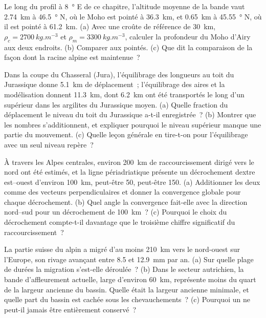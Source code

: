 \begin{exercise}[$\star\star$]\label{exo:b2:alpine-orogen:9}
Le long du profil à \qty{8}{\degree} E de ce chapitre, l'altitude moyenne de la bande vaut
\qty{2.74}{km} à \qty{46.5}{\degree} N, où le Moho est pointé à \qty{36.3}{km}, et
\qty{0.65}{km} à \qty{45.55}{\degree} N, où il est pointé à \qty{61.2}{km}. (a) Avec une
croûte de référence de \qty{30}{km}, $\rho_c = \qty{2700}{kg.m^{-3}}$ et $\rho_m =
\qty{3300}{kg.m^{-3}}$, calculer la profondeur du Moho d'Airy aux deux endroits. (b) Comparer aux
pointés. (c) Que dit la comparaison de la façon dont la racine alpine est maintenue~?
\end{exercise}

\begin{exercise}[$\star\star\star$]\label{exo:b2:alpine-orogen:10}
Dans la coupe du Chasseral (Jura), l'équilibrage des longueurs au toit du Jurassique
donne \qty{5.1}{km} de déplacement~; l'équilibrage des aires et la modélisation donnent \qty{11.3}{km}, dont
\qty{6.2}{km} ont été transportés le long d'un  supérieur dans les argilites du Jurassique moyen.
(a) Quelle fraction du déplacement le niveau du toit du Jurassique a-t-il enregistrée~? (b) Montrer que les
nombres s'additionnent, et expliquer pourquoi le niveau supérieur manque une partie du mouvement. (c) Quelle
leçon générale en tire-t-on pour l'équilibrage avec un seul niveau repère~?
\end{exercise}

\begin{exercise}[$\star\star\star$]\label{exo:b2:alpine-orogen:11}
À travers les Alpes centrales, environ \qty{200}{km} de raccourcissement dirigé vers le nord ont été
estimés, et la ligne périadriatique présente un décrochement dextre est--ouest d'environ
\qty{100}{km}, peut-être 50, peut-être 150. (a) Additionner les deux comme des vecteurs perpendiculaires et donner
la convergence globale pour chaque décrochement. (b) Quel angle la convergence fait-elle avec la
direction nord--sud pour un décrochement de \qty{100}{km}~? (c) Pourquoi le choix du décrochement
compte-t-il davantage que le troisième chiffre significatif du raccourcissement~?
\end{exercise}

\begin{exercise}[$\star\star\star$]\label{exo:b2:alpine-orogen:12}
La partie suisse du  alpin a migré d'au moins \qty{210}{km} vers le nord-ouest
sur l'Europe, son rivage avançant entre 8.5 et \qty{12.9}{mm} par an. (a) Sur quelle plage de
durées la migration s'est-elle déroulée~? (b) Dans le secteur autrichien, la bande d'affleurement actuelle,
large d'environ \qty{60}{km}, représente moins du quart de la largeur ancienne du bassin. Quelle était la
largeur ancienne minimale, et quelle part du bassin est cachée sous les chevauchements~? (c) Pourquoi un 
ne peut-il jamais être entièrement conservé~?
\end{exercise}

